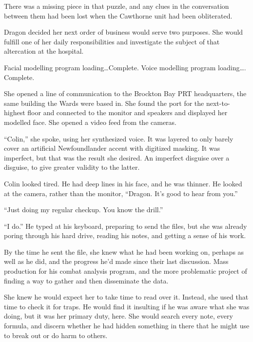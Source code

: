 There was a missing piece in that puzzle, and any clues in the conversation between them had been lost when the Cawthorne unit had been obliterated.



Dragon decided her next order of business would serve two purposes.  She would fulfill one of her daily responsibilities and investigate the subject of that altercation at the hospital.



Facial modelling program loading\ldots Complete.
Voice modelling program loading\ldots. Complete.



She opened a line of communication to the Brockton Bay PRT headquarters, the same building the Wards were based in.  She found the port for the next-to-highest floor and connected to the monitor and speakers and displayed her modelled face.  She opened a video feed from the cameras.



``Colin,'' she spoke, using her synthesized voice.  It was layered to only barely cover an artificial Newfoundlander accent with digitized masking.  It was imperfect, but that was the result she desired.  An imperfect disguise over a disguise, to give greater validity to the latter.



Colin looked tired.  He had deep lines in his face, and he was thinner.  He looked at the camera, rather than the monitor, ``Dragon.  It's good to hear from you.''



``Just doing my regular checkup.  You know the drill.''



``I do.''  He typed at his keyboard, preparing to send the files, but she was already poring through his hard drive, reading his notes, and getting a sense of his work.



By the time he sent the file, she knew what he had been working on, perhaps as well as he did, and the progress he'd made since their last discussion.  Mass production for his combat analysis program, and the more problematic project of finding a way to gather and then disseminate the data.



She knew he would expect her to take time to read over it.  Instead, she used that time to check it for traps.  He would find it insulting if he was aware what she was doing, but it was her primary duty, here.  She would search every note, every formula, and discern whether he had hidden something in there that he might use to break out or do harm to others.



